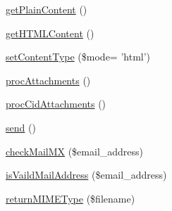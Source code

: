 \begin{DoxyCompactItemize}
\item 
\hyperlink{classMail_ac1a5a2b325a14e6331f13d2b2b18d9f8}{get\+Plain\+Content} ()
\item 
\hyperlink{classMail_a74db66148c78f2e732a3f2797b108eae}{get\+H\+T\+M\+L\+Content} ()
\item 
\hyperlink{classMail_adc8e047b6acd8b183bac7082180cb18f}{set\+Content\+Type} (\$mode= 'html')
\item 
\hyperlink{classMail_a136e94d3b4ae6cea8944cf05f58754ce}{proc\+Attachments} ()
\item 
\hyperlink{classMail_a185f66ac96139a53251ede273a120d13}{proc\+Cid\+Attachments} ()
\item 
\hyperlink{classMail_a6520941b529c223c1b59ec7544f7f7d6}{send} ()
\item 
\hyperlink{classMail_a0bdfc629861cf1048ac189d61fd57ef4}{check\+Mail\+M\+X} (\$email\+\_\+address)
\item 
\hyperlink{classMail_a2d7fd899ae79dc18e7804a044127dbac}{is\+Vaild\+Mail\+Address} (\$email\+\_\+address)
\item 
\hyperlink{classMail_afe036d54e43919318cb8e081533e7b90}{return\+M\+I\+M\+E\+Type} (\$filename)
\end{DoxyCompactItemize}
